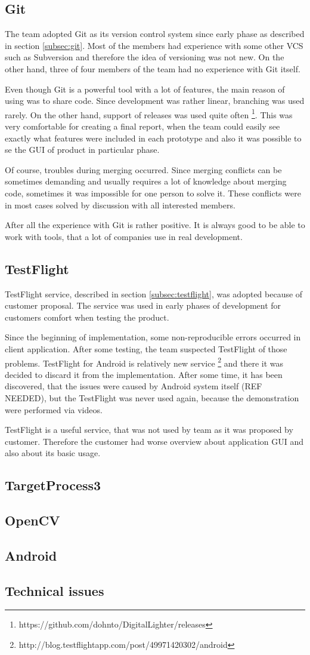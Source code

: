 \subsection{Git}
The team adopted Git as its version control system since early phase as described in section \ref{subsec:git}.
Most of the members had experience with some other VCS such as Subversion and therefore the idea of versioning was not new.
On the other hand, three of four members of the team had no experience with Git itself.

Even though Git is a powerful tool with a lot of features, the main reason of using was to share code.
Since development was rather linear, branching was used rarely.
On the other hand, support of releases was used quite often \footnote{https://github.com/dohnto/DigitalLighter/releases}.
This was very comfortable for creating a final report, when the team could easily see exactly what features were included in each prototype and also it was possible to se the GUI of product in particular phase.

Of course, troubles during merging occurred.
Since merging conflicts can be sometimes demanding and usually requires a lot of knowledge about merging code, sometimes it was impossible for one person to solve it.
These conflicts were in most cases solved by discussion with all interested members.

After all the experience with Git is rather positive. 
It is always good to be able to work with tools, that a lot of companies use in real development.


\subsection{TestFlight}
TestFlight service, described in section \ref{subsec:testflight}, was adopted because of customer proposal.
The service was used in early phases of development for customers comfort when testing the product.

Since the beginning of implementation, some non-reproducible errors occurred in client application.
After some testing, the team suspected TestFlight of those problems.
TestFlight for Android is relatively new service \footnote{http://blog.testflightapp.com/post/49971420302/android} and there it was decided to discard it from the implementation.
After some time, it has been discovered, that the issues were caused by Android system itself (REF NEEDED), but the TestFlight was never used again, because the demonstration were performed via videos.
 
TestFlight is a useful service, that was not used by team as it was proposed by customer.
Therefore the customer had worse overview about application GUI and also about its basic usage.

\subsection{TargetProcess3}
\subsection{OpenCV}
\subsection{Android}
\subsection{Technical issues}
